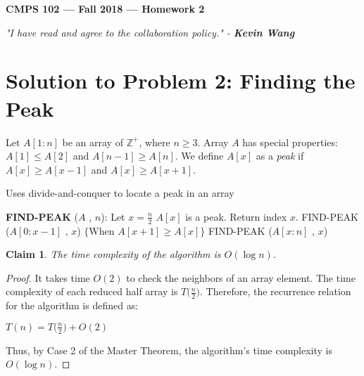 \documentclass[11pt]{article}
\theoremstyle{definition}
\theoremstyle{plain}
\newtheorem{claim}{Claim}
\theoremstyle{indented-remark}
\theoremstyle{indented-proof}
\begin{document}
\begin{center}
{\bf\Large CMPS 102 --- Fall 2018 ---  Homework 2}
\end{center}

\begin{center}
\textit{"I have read and agree to the collaboration policy." - \textbf{Kevin Wang}}
\end{center}

\section*{Solution to Problem 2: Finding the Peak}

Let $A[1:n]$ be an array of $\mathbb{Z}^{+}$, where $n \geq 3$. Array $A$ has special properties: $A[1] \leq A[2]$ and $A[n-1] \geq A[n]$. We define $A[x]$ as a \textit{peak} if $A[x] \geq A[x-1]$ and $A[x] \geq A[x+1]$.

\begin{algorithm}
\caption{Uses divide-and-conquer to locate a peak in an array}
\begin{algorithmic} 
\STATE \textbf{FIND-PEAK} ($A$ , $n$):
\STATE Let $x = \frac{n}{2}$
\STATE $A[x]$ is a peak. Return index $x$.
\STATE FIND-PEAK ($A[0:x-1]$ , $x$)
\ELSE 
\STATE $\{ \text{When } A[x+1] \geq A[x] \}$
\STATE FIND-PEAK ($A[x:n]$ , $x$)
\ENDIF
\end{algorithmic}
\end{algorithm}

\begin{claim}
The time complexity of the algorithm is $O(\log n)$.
\end{claim}

\begin{proof}
It takes time $O(2)$ to check the neighbors of an array element. The time complexity of each reduced half array is $T\big( \frac{n}{2} \big)$.
Therefore, the recurrence relation for the algorithm is defined as:
\begin{center}
$T(n) = T\big( \frac{n}{2} \big) + O(2)$
\end{center}
Thus, by Case 2 of the Master Theorem, the algorithm's time complexity is $O(\log n)$.
\end{proof}
\end{document}
